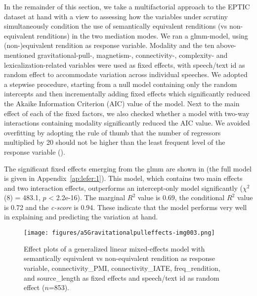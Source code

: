 \documentclass[output=paper]{langscibook}
\begin{document}
In the remainder of this section, we take a multifactorial approach to the EPTIC dataset at hand with a view to assessing how the variables under scrutiny simultaneously condition the use of semantically equivalent renditions (vs non-equivalent renditions) in the two mediation modes. We ran a glmm-model, using (non-)equivalent rendition as response variable. Modality and the ten above-mentioned gravitational-pull-, magnetism-, connectivity-, complexity- and le\-xi\-ca\-li\-za\-tion-related variables were used as fixed effects, with speech/text id as random effect to accommodate variation across individual speeches. We adopted a stepwise procedure, starting from a null model containing only the random intercepts and then incrementally adding fixed effects which significantly reduced the Akaike Information Criterion (AIC) value of the model. Next to the main effect of each of the fixed factors, we also checked whether a model with two-way interactions containing modality significantly reduced the AIC value. We avoided overfitting by adopting the rule of thumb that the number of regressors multiplied by 20 should not be higher than the least frequent level of the response variable (\citealt[cf.][72]{Harrell2015}). 

The significant fixed effects emerging from the glmm are shown in  (the full model is given in Appendix~\ref{ap:lefer:1}). This model, which contains two main effects and two interaction effects, outperforms an intercept-only model significantly ($χ^2$(8) = 483.1, $p$ < 2.2e-16). The marginal $R^2$ value is 0.69, the conditional $R^2$ value is 0.72 and the \textit{c-score} is 0.94. These indicate that the model performs very well in explaining and predicting the variation at hand.

\begin{figure}
\texttt{[image: figures/a5Gravitationalpulleffects-img003.png]}
 

\caption{Effect plots of a generalized linear mixed-effects model with semantically equivalent vs non-equivalent rendition as response variable, connectivity\_PMI, connectivity\_IATE, freq\_rendition, and source\_length as fixed effects and speech/text id as random effect ($n$=853).} 
\label{fig:lefer:3}
\end{figure}
\end{document}
